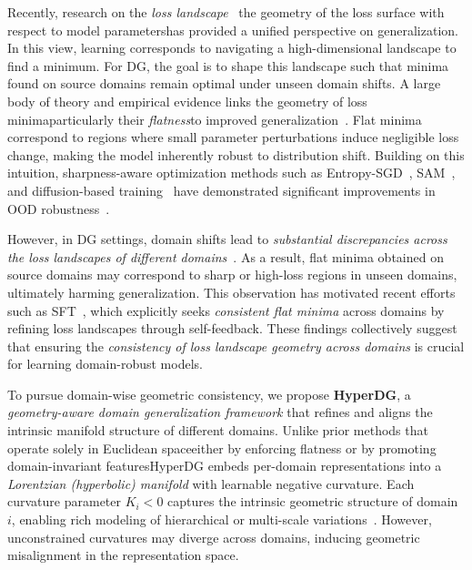 \documentclass[10pt]{article} %
\begin{document}
Recently, research on the \textit{loss landscape}~\cite{li2018visualizing} the geometry of the loss surface with respect to model parametershas provided a unified perspective on generalization. In this view, learning corresponds to navigating a high-dimensional landscape to find a minimum. For DG, the goal is to shape this landscape such that minima found on source domains remain optimal under unseen domain shifts. A large body of theory and empirical evidence links the geometry of loss minimaparticularly their \textit{flatness}to improved generalization~\cite{dziugaite2017computing,foret2020sharpness,hochreiter1994simplifying,jiang2019fantastic,keskar2016large}. Flat minima correspond to regions where small parameter perturbations induce negligible loss change, making the model inherently robust to distribution shift. Building on this intuition, sharpness-aware optimization methods such as Entropy-SGD~\cite{chaudhari2019entropy}, SAM~\cite{foret2020sharpness}, and diffusion-based training~\cite{mobahi2016training} have demonstrated significant improvements in OOD robustness~\cite{bahri2022sharpness,gulrajani2020search,shim2023multi}. 

However, in DG settings, domain shifts lead to \textit{substantial discrepancies across the loss landscapes of different domains}~\cite{cha2021swad,li2025seeking}. As a result, flat minima obtained on source domains may correspond to sharp or high-loss regions in unseen domains, ultimately harming generalization. This observation has motivated recent efforts such as SFT~\cite{li2025seeking}, which explicitly seeks \emph{consistent flat minima} across domains by refining loss landscapes through self-feedback. These findings collectively suggest that ensuring the \textit{consistency of loss landscape geometry across domains} is crucial for learning domain-robust models.

To pursue domain-wise geometric consistency, we propose \textbf{HyperDG}, a \textit{geometry-aware domain generalization framework} that refines and aligns the intrinsic manifold structure of different domains. Unlike prior methods that operate solely in Euclidean spaceeither by enforcing flatness or by promoting domain-invariant featuresHyperDG embeds per-domain representations into a \textit{Lorentzian (hyperbolic) manifold} with learnable negative curvature. Each curvature parameter $K_i < 0$ captures the intrinsic geometric structure of domain $i$, enabling rich modeling of hierarchical or multi-scale variations~\cite{bai2021ood,ghosal2024vision,li2020adapting,zhang2022delving}. However, unconstrained curvatures may diverge across domains, inducing geometric misalignment in the representation space.
\end{document}
